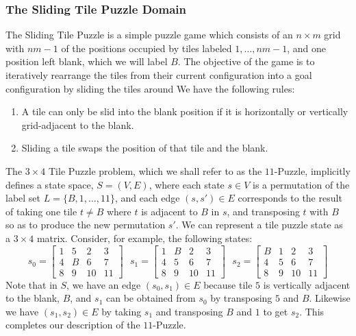 \documentclass{article}
\begin{document}
\subsubsection*{The Sliding Tile Puzzle Domain}

The Sliding Tile Puzzle is a simple puzzle game which consists of an \(n \times m\)
grid with \(nm - 1\) of the positions occupied by tiles labeled \(1, \ldots, nm - 1\),
and one position left blank, which we will label \(B\).
The objective of the game is to iteratively rearrange the
tiles from their current configuration into a goal configuration by sliding the tiles around
We have the following rules:
\begin{enumerate}
  \item A tile can only be slid into the blank position if it is horizontally or vertically grid-adjacent to the blank.
  \item Sliding a tile swaps the position of that tile and the blank.
\end{enumerate}
The \(3 \times 4\) Tile Puzzle problem, which we shall refer to as the \(11\)-Puzzle,
implicitly defines a state space, \( S = (V,E) \),
where each state \(s \in V\) is a permutation of the label set \(L = \{B, 1, \ldots, 11 \}\), 
and each edge \((s, s') \in E\) corresponds to the result of
taking one tile \(t \not = B\) where \(t\) is adjacent to \(B\) in \(s\),
and transposing \(t\) with \(B\) so as to produce the new permutation \(s'\).
We can represent a tile puzzle state as a \( 3 \times 4 \) matrix.
Consider, for example, the following states:
\[
s_0 =
\begin{bmatrix}
1 & 5 & 2 & 3 \\
4 & B & 6 & 7 \\
8 & 9 & 10 & 11
\end{bmatrix} \text{ }
s_1 =
\begin{bmatrix}
1 & B & 2 & 3 \\
4 & 5 & 6 & 7 \\
8 & 9 & 10 & 11
\end{bmatrix}\text{ }
s_2 =
\begin{bmatrix}
B & 1 & 2 & 3 \\
4 & 5 & 6 & 7 \\
8 & 9 & 10 & 11
\end{bmatrix}
\]
Note that in \(S\), we have an edge \((s_0, s_1) \in E\) because tile \(5\) is vertically adjacent
to the blank, \(B\), and \(s_1\) can be obtained from \(s_0\) by transposing \(5\) and \(B\).
Likewise we have \((s_1, s_2) \in E\) by taking \(s_1\) and transposing \(B\) and \(1\) to get \(s_2\).
This completes our description of the \(11\)-Puzzle.
\end{document}
